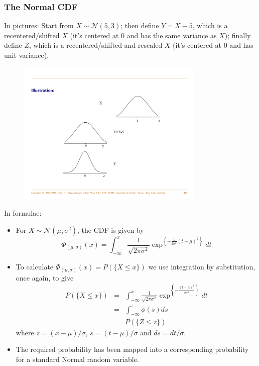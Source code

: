 \documentclass[notes=show,smaller,handout]{beamer}\usepackage[]{graphicx}\usepackage[]{color}
\renewcommand{\Pr}{P}
\newcommand{\N}{\mathcal{N}}
\newenvironment{stepitemize}{\begin{itemize}[<+->]}{\end{itemize} }
\begin{document}
\begin{frame}{\subsecname}
\frametitle{The Normal CDF}
In pictures:
Start from $X \sim \mathcal{N}(5,3)$; then define $Y=X-5$, which is a recentered/shifted $X$ (it's centered at 0 and has the same variance as $X$); finally define $Z$, which is a recentered/shifted and rescaled $X$ (it's centered at 0 and has unit variance).

\begin{figure}[ptb]\centering
\includegraphics[width=0.8\textwidth,height=0.65\textheight]{img/Std_Diego.pdf}%
\end{figure}%



\end{frame}

\begin{frame}{\secname}

In formulae:
\begin{stepitemize}
\item For $X\sim \N\left( \mu ,\sigma ^{2}\right) $, the CDF is given by%
$$
\Phi_{(\mu,\sigma)}\left( x\right) =\int_{-\infty }^{x}\frac{1}{\sqrt{2\pi \sigma ^{2}}}\exp^{ \left\{ -\frac{1}{2\sigma ^{2}}\left( t-\mu \right) ^{2}\right\}} dt
$$
\item To calculate $\Phi_{(\mu,\sigma)}\left( x\right)=\Pr(\{X\leq x\})$ we use integration by substitution, once again, to give
\begin{eqnarray*}
\Pr(\{ X\leq x\} )&=&\int_{-\infty}^x\frac{1}{\sqrt{2\pi\sigma^2}}\exp^{\left\{-\frac{(t-\mu)^2}{2\sigma^2}\right\}}dt\\
 &=&\int_{-\infty}^z\phi(s)ds\\
  &=&P(\{Z\leq z\})
\end{eqnarray*}
where $z=(x-\mu)/\sigma$, $s=(t-\mu)/\sigma$ and $ds=dt/\sigma$.
\item The required probability has been mapped into a corresponding probability for a standard Normal random variable.
\end{stepitemize}

\end{frame}%
\end{document}
